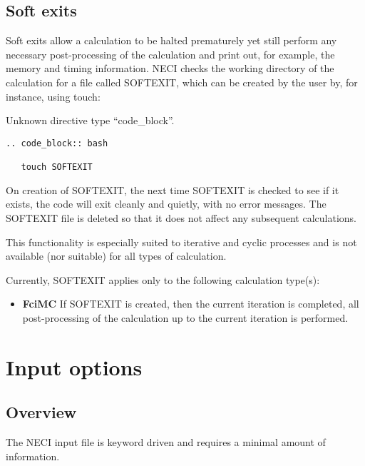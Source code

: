 \documentclass[openany,a4paper,10pt]{manual}
\begin{document}
\section{Soft exits}

Soft exits allow a calculation to be halted prematurely yet still
perform any necessary post-processing of the calculation and print out,
for example, the memory and timing information.  NECI checks the working
directory of the calculation for a file called SOFTEXIT, which can be
created by the user by, for instance, using touch:

Unknown directive type ``code\_block''.

\begin{Verbatim}[commandchars=@\[\]]
.. code_block:: bash

   touch SOFTEXIT
\end{Verbatim}


On creation of SOFTEXIT, the next time SOFTEXIT is checked to see
if it exists, the code will exit cleanly and quietly, with no error
messages.  The SOFTEXIT file is deleted so that it does not affect
any subsequent calculations.

This functionality is especially suited to iterative and cyclic
processes and is not available (nor suitable) for all types of
calculation.

Currently, SOFTEXIT applies only to the following calculation
type(s):
\begin{itemize}
\item {} 
\textbf{FciMC}
If SOFTEXIT is created, then the current iteration is completed,
all post-processing of the calculation up to the current iteration
is performed.

\end{itemize}

\resetcurrentobjects


\hypertarget{input-index}{}\chapter{Input options}

\resetcurrentobjects


\hypertarget{input-overview}{}\section{Overview}

The NECI input file is keyword driven and requires a minimal amount of information.
\end{document}
